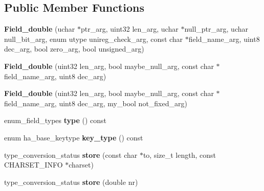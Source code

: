 \subsection*{Public Member Functions}
\begin{DoxyCompactItemize}
\item 
\mbox{\label{classField__double_aac8f45ca120b78ce3bc0faaea025d9f2}} 
{\bfseries Field\+\_\+double} (uchar $\ast$ptr\+\_\+arg, uint32 len\+\_\+arg, uchar $\ast$null\+\_\+ptr\+\_\+arg, uchar null\+\_\+bit\+\_\+arg, enum utype unireg\+\_\+check\+\_\+arg, const char $\ast$field\+\_\+name\+\_\+arg, uint8 dec\+\_\+arg, bool zero\+\_\+arg, bool unsigned\+\_\+arg)
\item 
\mbox{\label{classField__double_aca162c3320e7227cab4796fc4f868262}} 
{\bfseries Field\+\_\+double} (uint32 len\+\_\+arg, bool maybe\+\_\+null\+\_\+arg, const char $\ast$field\+\_\+name\+\_\+arg, uint8 dec\+\_\+arg)
\item 
\mbox{\label{classField__double_a31cb3bff9e5b6fc0824e8e161a964f23}} 
{\bfseries Field\+\_\+double} (uint32 len\+\_\+arg, bool maybe\+\_\+null\+\_\+arg, const char $\ast$field\+\_\+name\+\_\+arg, uint8 dec\+\_\+arg, my\+\_\+bool not\+\_\+fixed\+\_\+arg)
\item 
\mbox{\label{classField__double_a68921a46a8a1e8c2f45ce69057145db8}} 
enum\+\_\+field\+\_\+types {\bfseries type} () const
\item 
\mbox{\label{classField__double_aa6d590153ab0985eb3a35594028b7caa}} 
enum ha\+\_\+base\+\_\+keytype {\bfseries key\+\_\+type} () const
\item 
\mbox{\label{classField__double_a0f14f65f11eb17afa6f6456e19cc1410}} 
type\+\_\+conversion\+\_\+status {\bfseries store} (const char $\ast$to, size\+\_\+t length, const C\+H\+A\+R\+S\+E\+T\+\_\+\+I\+N\+FO $\ast$charset)
\item 
\mbox{\label{classField__double_aaf2cd0f2df563443feda0022148a30d9}} 
type\+\_\+conversion\+\_\+status {\bfseries store} (double nr)
\item 
\mbox{\label{classField__double_a75b1d4f68b81c9235b7d417ad2a91d01}} 

\end{DoxyCompactItemize}
